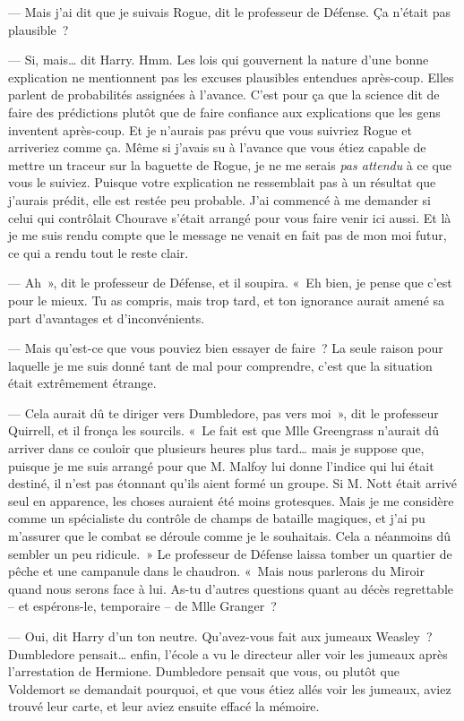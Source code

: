 --- Mais j'ai dit que je suivais Rogue, dit le professeur de Défense. Ça n'était pas plausible~?

--- Si, mais… dit Harry. Hmm. Les lois qui gouvernent la nature d'une bonne explication ne mentionnent pas les excuses plausibles entendues après-coup. Elles parlent de probabilités assignées à l'avance. C'est pour ça que la science dit de faire des prédictions plutôt que de faire confiance aux explications que les gens inventent après-coup. Et je n'aurais pas prévu que vous suivriez Rogue et arriveriez comme ça. Même si j'avais su à l'avance que vous étiez capable de mettre un traceur sur la baguette de Rogue, je ne me serais \emph{pas attendu} à ce que vous le suiviez. Puisque votre explication ne ressemblait pas à un résultat que j'aurais prédit, elle est restée peu probable. J'ai commencé à me demander si celui qui contrôlait Chourave s'était arrangé pour vous faire venir ici aussi. Et là je me suis rendu compte que le message ne venait en fait pas de mon moi futur, ce qui a rendu tout le reste clair.

--- Ah~», dit le professeur de Défense, et il soupira. «~Eh bien, je pense que c'est pour le mieux. Tu as compris, mais trop tard, et ton ignorance aurait amené sa part d'avantages et d'inconvénients.

--- Mais qu'est-ce que vous pouviez bien essayer de faire~? La seule raison pour laquelle je me suis donné tant de mal pour comprendre, c'est que la situation était extrêmement étrange.

--- Cela aurait dû te diriger vers Dumbledore, pas vers moi~», dit le professeur Quirrell, et il fronça les sourcils. «~Le fait est que Mlle Greengrass n'aurait dû arriver dans ce couloir que plusieurs heures plus tard… mais je suppose que, puisque je me suis arrangé pour que M. Malfoy lui donne l'indice qui lui était destiné, il n'est pas étonnant qu'ils aient formé un groupe. Si M. Nott était arrivé seul en apparence, les choses auraient été moins grotesques. Mais je me considère comme un spécialiste du contrôle de champs de bataille magiques, et j'ai pu m'assurer que le combat se déroule comme je le souhaitais. Cela a néanmoins dû sembler un peu ridicule.~» Le professeur de Défense laissa tomber un quartier de pêche et une campanule dans le chaudron. «~Mais nous parlerons du Miroir quand nous serons face à lui. As-tu d'autres questions quant au décès regrettable -- et espérons-le, temporaire -- de Mlle Granger~?

--- Oui, dit Harry d'un ton neutre. Qu'avez-vous fait aux jumeaux Weasley~? Dumbledore pensait… enfin, l'école a vu le directeur aller voir les jumeaux après l'arrestation de Hermione. Dumbledore pensait que vous, ou plutôt que Voldemort se demandait pourquoi, et que vous étiez allés voir les jumeaux, aviez trouvé leur carte, et leur aviez ensuite effacé la mémoire.

